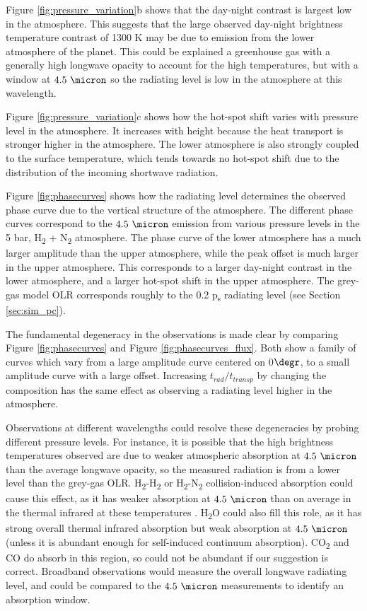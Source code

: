 Figure \ref{fig:pressure_variation}b shows that the day-night contrast is largest low in the atmosphere. This suggests that the large observed day-night brightness temperature contrast of 1300 K may be due to emission from the lower atmosphere of the planet. This could be explained a greenhouse gas with a generally high longwave opacity to account for the high temperatures, but with a window at $4.5\ \micron$ so the radiating level is low in the atmosphere at this wavelength.

Figure \ref{fig:pressure_variation}c shows how the hot-spot shift varies with pressure level in the atmosphere. It increases with height because the heat transport is stronger higher in the atmosphere. The lower atmosphere is also strongly coupled to the surface temperature, which tends towards no hot-spot shift due to the distribution of the incoming shortwave radiation.

Figure \ref{fig:phasecurves} shows how the radiating level determines the observed phase curve due to the vertical structure of the atmosphere. The different phase curves correspond to the $4.5\ \micron$ emission from various pressure levels in the 5 bar, H\textsubscript{2} + N\textsubscript{2} atmosphere. The phase curve of the lower atmosphere has a much larger amplitude than the upper atmosphere, while the peak offset is much larger in the upper atmosphere. This corresponds to a larger day-night contrast in the lower atmosphere, and a larger hot-spot shift in the upper atmosphere. The grey-gas model OLR corresponds roughly to the 0.2 p\textsubscript{s} radiating level (see Section \ref{sec:sim_pc}).

The fundamental degeneracy in the observations is made clear by comparing Figure \ref{fig:phasecurves} and Figure \ref{fig:phasecurves_flux}. Both show a family of curves which vary from a large amplitude curve centered on 0$\degr$, to a small amplitude curve with a large offset. Increasing $t_{rad}/t_{transp}$ by changing the composition has the same effect as observing a radiating level higher in the atmosphere.

Observations at different wavelengths could resolve these degeneracies by  probing different pressure levels. For instance, it is possible that the high brightness temperatures observed are due to weaker atmospheric absorption at $4.5\ \micron$ than the average longwave opacity, so the measured radiation is from a lower level than the grey-gas OLR. H\textsubscript{2}-H\textsubscript{2} or H\textsubscript{2}-N\textsubscript{2} collision-induced absorption could cause this effect, as it has weaker absorption at $4.5\ \micron$ than on average in the thermal infrared at these temperatures \citep{wordsworth2013hydrogen}. H\textsubscript{2}O could also fill this role, as it has strong overall thermal infrared absorption but weak absorption at $4.5\ \micron$ (unless it is abundant enough for self-induced continuum absorption). CO\textsubscript{2} and CO do absorb in this region, so could not be abundant if our suggestion is correct. Broadband observations would measure the overall longwave radiating level, and could be compared to the $4.5\ \micron$ measurements to identify an absorption window.

